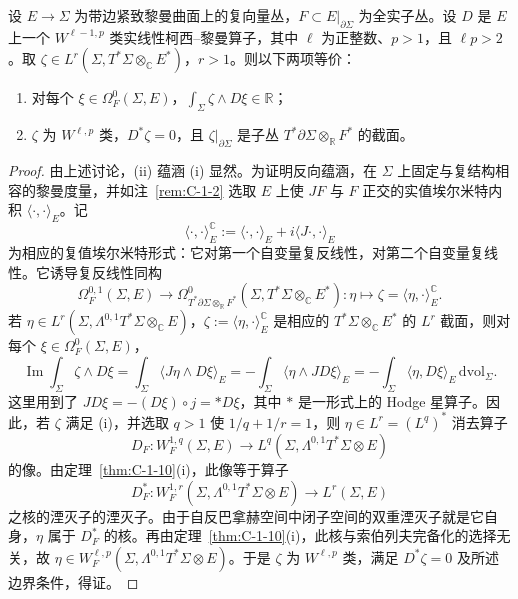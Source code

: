 \begin{corollary}\label{cor:C-1-11}
设 $E\to\Sigma$ 为带边紧致黎曼曲面上的复向量丛，$F\subset E|_{\partial\Sigma}$ 为全实子丛。设 $D$ 是 $E$ 上一个 $W^{\ell-1,p}$ 类实线性柯西–黎曼算子，其中 $\ell$ 为正整数、$p>1$，且 $\ell p>2$。取 $\zeta\in L^r(\Sigma,T^*\Sigma\otimes_{\mathbb C}E^*)$，$r>1$。则以下两项等价：
\begin{enumerate}[label=(\roman*)]
\item 对每个 $\xi\in\Omega_F^0(\Sigma,E)$，$\int_\Sigma\zeta\wedge D\xi\in\mathbb R$；
\item $\zeta$ 为 $W^{\ell,p}$ 类，$D^*\zeta=0$，且 $\zeta|_{\partial\Sigma}$ 是子丛 $T^*\partial\Sigma\otimes_{\mathbb R}F^*$ 的截面。
\end{enumerate}
\end{corollary}
\begin{proof}
由上述讨论，(ii) 蕴涵 (i) 显然。为证明反向蕴涵，在 $\Sigma$ 上固定与复结构相容的黎曼度量，并如注~\ref{rem:C-1-2} 选取 $E$ 上使 $JF$ 与 $F$ 正交的实值埃尔米特内积 $\langle\cdot,\cdot\rangle_E$。记
\[
  \langle\cdot,\cdot\rangle_E^{\mathbb C}
  :=\langle\cdot,\cdot\rangle_E+i\langle J\cdot,\cdot\rangle_E
\]
为相应的复值埃尔米特形式：它对第一个自变量复反线性，对第二个自变量复线性。它诱导复反线性同构
\[
  \Omega_F^{0,1}(\Sigma,E)
  \longrightarrow\Omega^0_{T^*\partial\Sigma\otimes_{\mathbb R}F^*}
  (\Sigma,T^*\Sigma\otimes_{\mathbb C}E^*):
  \eta\longmapsto\zeta=\langle\eta,\cdot\rangle_E^{\mathbb C}.
\]
若 $\eta\in L^r(\Sigma,\Lambda^{0,1}T^*\Sigma\otimes_{\mathbb C}E)$，$\zeta:=\langle\eta,\cdot\rangle_E^{\mathbb C}$ 是相应的 $T^*\Sigma\otimes_{\mathbb C}E^*$ 的 $L^r$ 截面，则对每个 $\xi\in\Omega_F^0(\Sigma,E)$，
\[
  \operatorname{Im}\int_\Sigma\zeta\wedge D\xi
  =\int_\Sigma\langle J\eta\wedge D\xi\rangle_E
  =-\int_\Sigma\langle\eta\wedge JD\xi\rangle_E
  =-\int_\Sigma\langle\eta,D\xi\rangle_E\,\mathrm{dvol}_\Sigma.
\]
这里用到了 $JD\xi=-(D\xi)\circ j=*D\xi$，其中 $*$ 是一形式上的 Hodge 星算子。因此，若 $\zeta$ 满足 (i)，并选取 $q>1$ 使 $1/q+1/r=1$，则 $\eta\in L^r=(L^q)^*$ 消去算子
\[
  D_F:W_F^{1,q}(\Sigma,E)
  \longrightarrow L^q(\Sigma,\Lambda^{0,1}T^*\Sigma\otimes E)
\]
的像。由定理~\ref{thm:C-1-10}(i)，此像等于算子
\[
  D_F^*:W_F^{1,r}(\Sigma,\Lambda^{0,1}T^*\Sigma\otimes E)
  \longrightarrow L^r(\Sigma,E)
\]
之核的湮灭子的湮灭子。由于自反巴拿赫空间中闭子空间的双重湮灭子就是它自身，$\eta$ 属于 $D_F^*$ 的核。再由定理~\ref{thm:C-1-10}(i)，此核与索伯列夫完备化的选择无关，故 $\eta\in W_F^{\ell,p}(\Sigma,\Lambda^{0,1}T^*\Sigma\otimes E)$。于是 $\zeta$ 为 $W^{\ell,p}$ 类，满足 $D^*\zeta=0$ 及所述边界条件，得证。
\end{proof}

